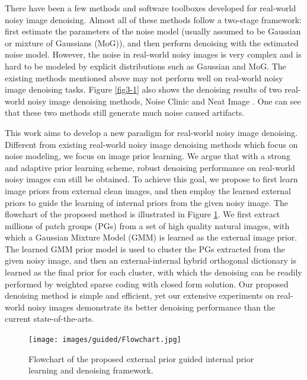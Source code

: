 There have been a few methods \cite{fullyblind,rabie2005robust,Liu2008,almapg,crosschannel2016,Zhu_2016_CVPR,noiseclinic,ncwebsite} and software toolboxes \cite{neatimage} developed for real-world noisy image denoising. Almost all of these methods follow a two-stage framework: first estimate the parameters of the noise model (usually assumed to be Gaussian or mixture of Gaussians (MoG)), and then perform denoising with the estimated noise model. However, the noise in real-world noisy images is very complex and is hard to be modeled by explicit distributions such as Gaussian and MoG. The existing methods \cite{fullyblind,rabie2005robust,Liu2008,almapg,crosschannel2016,Zhu_2016_CVPR,noiseclinic,
ncwebsite,neatimage} mentioned above may not perform well on real-world noisy image denoising tasks. Figure \ref{fig3-1} also shows the denoising results of two real-world noisy image denoising methods, Noise Clinic \cite{noiseclinic,ncwebsite} and Neat Image \cite{neatimage}. One can see that these two methods still generate much noise caused artifacts. 

This work aims to develop a new paradigm for real-world noisy image denoising. Different from existing real-world noisy image denoising methods \cite{fullyblind,rabie2005robust,Liu2008,almapg,crosschannel2016,Zhu_2016_CVPR,noiseclinic,ncwebsite}  which focus on noise modeling, we focus on image prior learning. We argue that with a strong and adaptive prior learning scheme, robust denoising performance on real-world noisy images can still be obtained. To achieve this goal, we propose to first learn image priors from external clean images, and then employ the learned external priors to guide the learning of internal priors from the given noisy image. The flowchart of the proposed method is illustrated in Figure \ref{fig3-2}. We first extract millions of patch groups (PGs) from a set of high quality natural images, with which a Gaussian Mixture Model (GMM) is learned as the external image prior. The learned GMM prior model is used to cluster the PGs extracted from the given noisy image, and then an external-internal hybrid orthogonal dictionary is learned as the final prior for each cluster, with which the denoising can be readily performed by weighted sparse coding with closed form solution. Our proposed denoising method is simple and efficient, yet our extensive experiments on real-world noisy images demonstrate its better denoising performance than the current state-of-the-arts.


\begin{figure}[t!]
\centering
\captionsetup{justification=centering,margin=0.1cm}
\texttt{[image: images/guided/Flowchart.jpg]}
\centering
\vspace{-3mm}
\caption{Flowchart of the proposed external prior guided internal prior learning and denoising framework.}
\label{fig3-2}
\end{figure}



